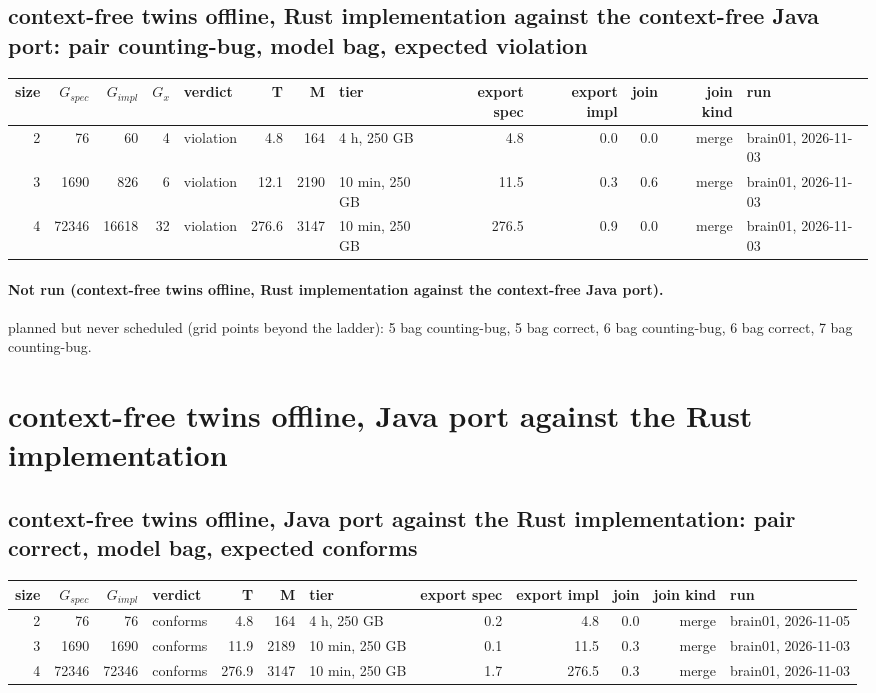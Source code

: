 \documentclass[10pt]{article}
\begin{document}
\subsection*{context-free twins offline, Rust implementation against the context-free Java port: pair \textsf{counting-bug}, model bag, expected violation}
\begin{longtable}{@{}rrrrlrrlrrrrl@{}}
\toprule
size & $G_{\mathit{spec}}$ & $G_{\mathit{impl}}$ & $G_x$ & verdict & T & M & tier & export spec & export impl & join & join kind & run \\
\midrule
\endhead
\color{blue} 2 & 76 & 60 & 4 & violation & 4.8 & 164 & 4 h, 250 GB & 4.8 & 0.0 & 0.0 & merge & brain01, 2026-11-03 \\
\color{blue} 3 & 1690 & 826 & 6 & violation & 12.1 & 2190 & 10 min, 250 GB & 11.5 & 0.3 & 0.6 & merge & brain01, 2026-11-03 \\
\color{blue} 4 & 72346 & 16618 & 32 & violation & 276.6 & 3147 & 10 min, 250 GB & 276.5 & 0.9 & 0.0 & merge & brain01, 2026-11-03 \\
\bottomrule
\end{longtable}
\paragraph{Not run (context-free twins offline, Rust implementation against the context-free Java port).}
planned but never scheduled (grid points beyond the ladder): 5 bag counting-bug, 5 bag correct, 6 bag counting-bug, 6 bag correct, 7 bag counting-bug.\par
\section*{context-free twins offline, Java port against the Rust implementation}
\subsection*{context-free twins offline, Java port against the Rust implementation: pair \textsf{correct}, model bag, expected conforms}
\begin{longtable}{@{}rrrlrrlrrrrl@{}}
\toprule
size & $G_{\mathit{spec}}$ & $G_{\mathit{impl}}$ & verdict & T & M & tier & export spec & export impl & join & join kind & run \\
\midrule
\endhead
\color{blue} 2 & 76 & 76 & conforms & 4.8 & 164 & 4 h, 250 GB & 0.2 & 4.8 & 0.0 & merge & brain01, 2026-11-05 \\
\color{blue} 3 & 1690 & 1690 & conforms & 11.9 & 2189 & 10 min, 250 GB & 0.1 & 11.5 & 0.3 & merge & brain01, 2026-11-03 \\
\color{blue} 4 & 72346 & 72346 & conforms & 276.9 & 3147 & 10 min, 250 GB & 1.7 & 276.5 & 0.3 & merge & brain01, 2026-11-03 \\
\bottomrule
\end{longtable}
\end{document}
